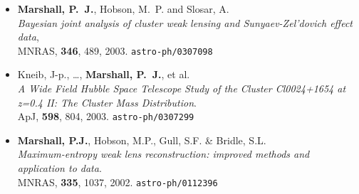 \begin{itemize}

% 

\item{\textbf{{Marshall}, P.~J.}, {Hobson}, M.~P. and {Slosar}, A.\\
\textit{Bayesian joint analysis of cluster weak lensing and Sunyaev-Zel'dovich effect data},\\
MNRAS, \textbf{346}, 489, 2003.
\texttt{astro-ph/0307098}
}

\item{{Kneib}, J-p.,  \ldots, \textbf{{Marshall}, P.~J.}, et al.\\
\textit{A Wide Field Hubble Space Telescope Study of the Cluster Cl0024+1654 at z=0.4 II: The Cluster Mass Distribution}.\\
ApJ, \textbf{598}, 804, 2003.
\texttt{astro-ph/0307299}
}

\item{\textbf{Marshall, P.J.}, Hobson, M.P., Gull, S.F. \& Bridle, S.L.\\
\textit{Maximum-entropy weak lens reconstruction: improved methods and application to data}.\\
MNRAS, \textbf{335}, 1037, 2002.
\texttt{astro-ph/0112396}
}

\end{itemize}

